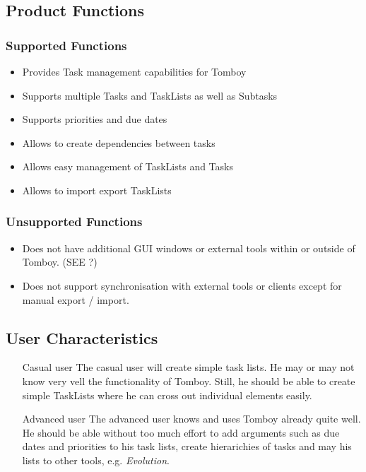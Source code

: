 \subsection{Product Functions}
\label{description:functions}

  \subsubsection*{Supported Functions}
  \label{description:functions:supported}

    \begin{itemize}
      \item Provides Task management capabilities for Tomboy
      \item Supports multiple Tasks and TaskLists as well as Subtasks
      \item Supports priorities and due dates
      \item Allows to create dependencies between tasks
      \item Allows easy management of TaskLists and Tasks
      \item Allows to import export TaskLists
    \end{itemize}

    \subsubsection*{Unsupported Functions}
      \label{description:functions:unsupported}
      \begin{itemize}
        \item Does not have additional GUI windows or external tools within or outside of Tomboy. (SEE ?) %
        \item Does not support synchronisation with external tools or clients except for manual export / import.
      \end{itemize}

\subsection{User Characteristics}
\label{description:usercharacteristics}

  \begin{itemize}
    \item[Casual user] The casual user will create simple task lists. He may or may not know very vell the functionality of Tomboy. Still, he should be able to create simple TaskLists where he can cross out individual elements easily.

    \item [Advanced user] The advanced user knows and uses Tomboy already quite well. He should be able without too much effort to add arguments such as due dates and priorities to his task lists, create hierarichies of tasks and may his lists to other tools, e.g. \textit{Evolution}.
  \end{itemize}


